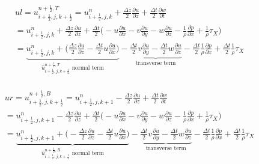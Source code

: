 \documentclass{article}
\numberwithin{equation}{subsection}
\begin{document}
\begin{align}
\begin{split}
& ul = u_{i+\frac{1}{2},j,k+\frac{1}{2}}^{n+\frac{1}{2},T} = u_{i+\frac{1}{2},j,k}^n + \frac{\Delta z}{2}\frac{\partial u}{\partial z} + \frac{\Delta t}{2}\frac{\partial w}{\partial t} \\
&= u_{i+\frac{1}{2},j,k}^n + \frac{\Delta z}{2} \frac{\partial u}{\partial z} + \frac{\Delta t}{2} \Big( -u\frac{\partial u}{\partial x} -v\frac{\partial u}{\partial y} -w\frac{\partial u}{\partial z} - \frac{1}{\rho}\frac{\partial p}{\partial x} +\frac{1}{\rho}\tau_X\Big) \\
&= \underbrace{u_{i+\frac{1}{2},j,k}^n + \Big(\frac{\Delta z}{2}\frac{\partial u}{\partial z} - \frac{\Delta t}{2} u\frac{\partial u}{\partial x}\Big)}_\text{$\widehat{u}_{i+\frac{1}{2},j,k+\frac{1}{2}}^{n+\frac{1}{2},T}$ normal term} -\underbrace{\frac{\Delta t}{2}v\frac{\partial u}{\partial y} - \frac{\Delta t}{2}w\frac{\partial u}{\partial z}}_\text{transverse term} - \frac{\Delta t}{2}\frac{1}{\rho}\frac{\partial p}{\partial x} + \frac{\Delta t}{2}\frac{1}{\rho}\tau_X
\end{split}
\end{align}

\begin{align}
\begin{split}
& ur = u_{i+\frac{1}{2},j,k+\frac{1}{2}}^{n+\frac{1}{2},B} = u_{i+\frac{1}{2},j,k+1}^n - \frac{\Delta z}{2}\frac{\partial u}{\partial z} + \frac{\Delta t}{2}\frac{\partial w}{\partial t} \\
&= u_{i+\frac{1}{2},j,k+1}^n - \frac{\Delta z}{2} \frac{\partial u}{\partial z} + \frac{\Delta t}{2} \Big( -u\frac{\partial u}{\partial x} -v\frac{\partial u}{\partial y} -w\frac{\partial u}{\partial z} - \frac{1}{\rho}\frac{\partial p}{\partial x} +\frac{1}{\rho}\tau_X\Big) \\
&= \underbrace{u_{i+\frac{1}{2},j,k+1}^n + \Big(-\frac{\Delta z}{2}\frac{\partial u}{\partial z} - \frac{\Delta t}{2} u\frac{\partial u}{\partial x}\Big)}_\text{$\widehat{u}_{i+\frac{1}{2},j,k+\frac{1}{2}}^{n+\frac{1}{2},B}$ normal term} -\underbrace{\frac{\Delta t}{2}v\frac{\partial u}{\partial y} - \frac{\Delta t}{2}w\frac{\partial u}{\partial z}}_\text{transverse term} - \frac{\Delta t}{2}\frac{1}{\rho}\frac{\partial p}{\partial x} + \frac{\Delta t}{2}\frac{1}{\rho}\tau_X
\end{split}
\end{align}
\end{document}
